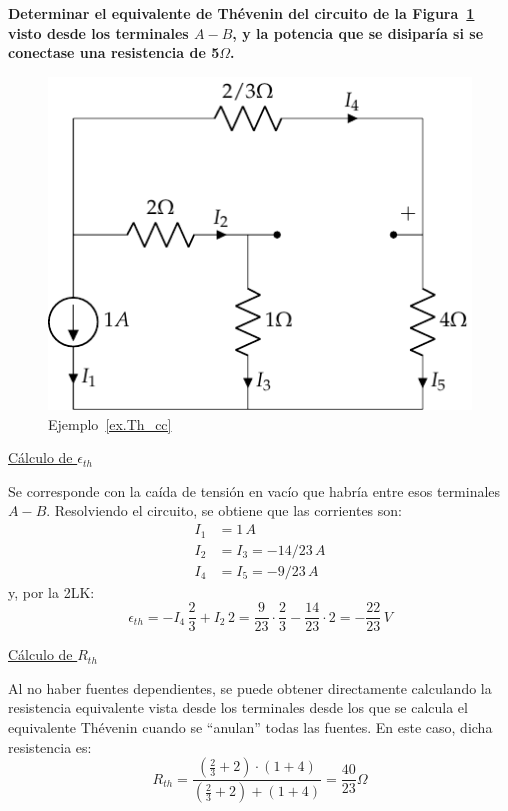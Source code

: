 \begin{example}\label{ex.Th_cc}
    \textbf{Determinar el equivalente de Thévenin del circuito de la Figura~\ref{fig.ej_Th_cc} visto desde los terminales $A-B$, y la potencia que se disiparía si se conectase una resistencia de 5$\Omega$.}
    \begin{figure}[H]
        \centering
        \includegraphics{../figs/ej_Th_cc1.pdf}
        \caption{Ejemplo~\ref{ex.Th_cc}}
        \label{fig.ej_Th_cc}
    \end{figure}
    
    \underline{Cálculo de $\epsilon_{th}$}
    
    Se corresponde con la caída de tensión en vacío que habría entre esos terminales $A-B$. Resolviendo el circuito, se obtiene que las corrientes son:
    \begin{align*}
        I_1&=1\,A\\
        I_2&=I_3=-14/23\,A\\
        I_4&=I_5=-9/23\,A
    \end{align*}
    y, por la 2LK:
    \begin{equation*}
        \epsilon_{th}=-I_4\,\dfrac{2}{3}+I_2\,2=\dfrac{9}{23}\cdot\dfrac{2}{3}-\dfrac{14}{23}\cdot 2=-\dfrac{22}{23}\,V
    \end{equation*}
    
    \underline{Cálculo de $R_{th}$}
    
    Al no haber fuentes dependientes, se puede obtener directamente calculando la resistencia equivalente vista desde los terminales desde los que se calcula el equivalente Thévenin cuando se ``anulan'' todas las fuentes. En este caso, dicha resistencia es:
    \begin{equation*}
        R_{th}=\dfrac{(\frac{2}{3}+2)\cdot(1+4)}{(\frac{2}{3}+2)+(1+4)}=\dfrac{40}{23}\Omega
    \end{equation*}
    

\end{example}
